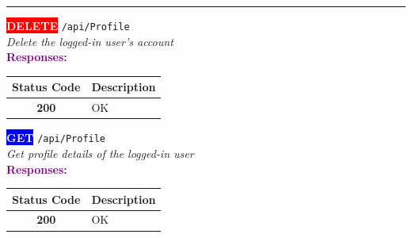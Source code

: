\noindent\textcolor{gray!60}{\rule{\linewidth}{0.5pt}}
\vspace{0.5em}

\begin{tcolorbox}[
    colback=red!5,
    colframe=red,
    arc=2mm,
    boxrule=1pt,
    left=5pt,
    right=5pt,
    top=5pt,
    bottom=5pt
]
\noindent\colorbox{red}{\textcolor{white}{\textbf{DELETE}}} 
\texttt{\large /api/Profile}\\[0.3em]
\textit{Delete the logged-in user's account}\\[0.3em]
\vspace{0.3em}
\textbf{\textcolor{purple}{Responses:}}\\[0.2em]
\begin{tabular}{|c|p{10cm}|}
\hline
\rowcolor{gray!20}
\textbf{Status Code} & \textbf{Description} \\ \hline
\colorbox{green!20}{\textbf{200}} & OK \\ \hline
\end{tabular}
\end{tcolorbox}
\vspace{0.5em}

\begin{tcolorbox}[
    colback=blue!5,
    colframe=blue,
    arc=2mm,
    boxrule=1pt,
    left=5pt,
    right=5pt,
    top=5pt,
    bottom=5pt
]
\noindent\colorbox{blue}{\textcolor{white}{\textbf{GET}}} 
\texttt{\large /api/Profile}\\[0.3em]
\textit{Get profile details of the logged-in user}\\[0.3em]
\vspace{0.3em}
\textbf{\textcolor{purple}{Responses:}}\\[0.2em]
\begin{tabular}{|c|p{10cm}|}
\hline
\rowcolor{gray!20}
\textbf{Status Code} & \textbf{Description} \\ \hline
\colorbox{green!20}{\textbf{200}} & OK \\ \hline
\end{tabular}
\end{tcolorbox}
\vspace{0.5em}

